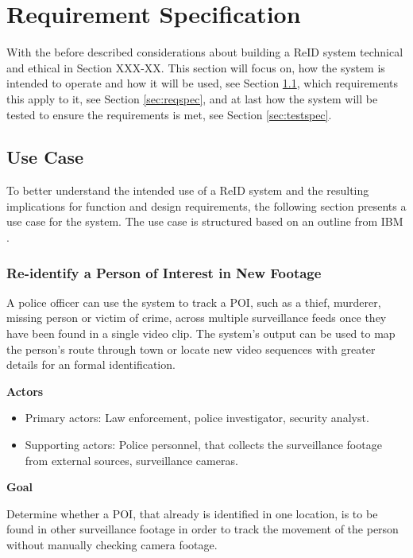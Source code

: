 \chapter{Requirement Specification} 
\label{cha:reqspec}

With the before described considerations about building a \acs{ReID} system technical and ethical in Section XXX-XX.
This section will focus on, how the system is intended to operate and how it will be used, see Section \ref{sec:usecase}, which requirements this apply to it, see Section \ref{sec:reqspec}, and at last how the system will be tested to ensure the requirements is met, see Section \ref{sec:testspec}.

\section{Use Case}
\label{sec:usecase}

To better understand the intended use of a \acs{ReID} system and the resulting implications for function and design requirements, the following section presents a use case for the system. The use case is structured based on an outline from IBM \cite{usecase}.

\subsection{Re-identify a Person of Interest in New Footage}
A police officer can use the system to track a \acs{POI}, such as a thief, murderer, missing person or victim of crime, across multiple surveillance feeds once they have been found in a single video clip. The system's output can be used to map the person's route through town or locate new video sequences with greater details for an formal identification.

\vspace{1em}

\noindent\textbf{Actors}
\begin{itemize}
    \item Primary actors: Law enforcement, police investigator, security analyst.
    \item Supporting actors: Police personnel, that collects the surveillance footage from external sources, surveillance cameras.
\end{itemize}
\vspace{1em}

\noindent\textbf{Goal}

\noindent Determine whether a \acs{POI}, that already is identified in one location, is to be found in other surveillance footage in order to track the movement of the person without manually checking camera footage.

